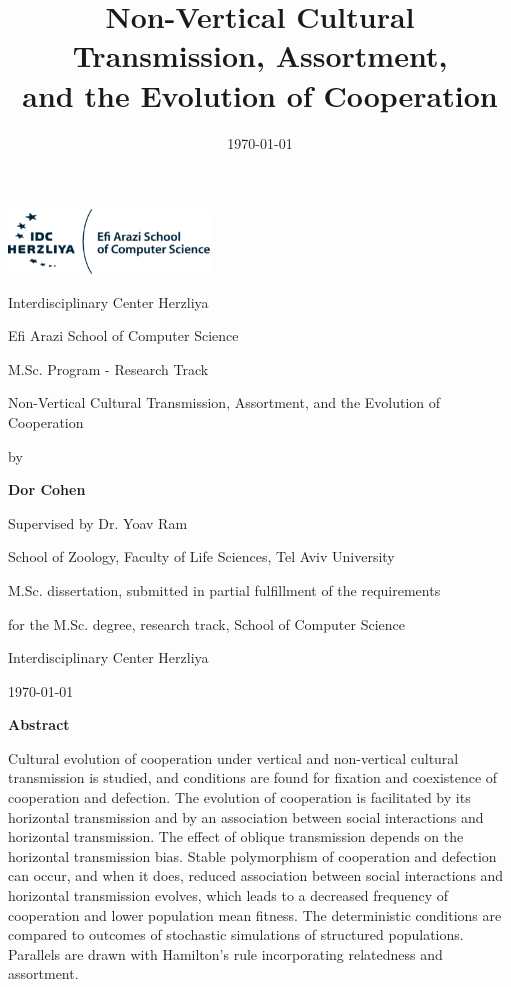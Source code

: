 \documentclass[12pt]{extarticle}
\title{Non-Vertical Cultural Transmission, Assortment, \\and the Evolution of Cooperation}
\date{\today}
\begin{document}
\begin{titlepage}
	\centering
	\includegraphics[width=0.4\textwidth]{IDC_logo}\par\vspace{1cm}
	{\huge Interdisciplinary Center Herzliya \par}
	{\Large Efi Arazi School of Computer Science \par}
	{\Large M.Sc. Program - Research Track \par}

	\vspace{1.5cm}
	{\Huge Non-Vertical Cultural 
  Transmission, 
  Assortment, and the 
  Evolution of 
  Cooperation \par}
	\vspace{1.5cm}
	{\large by\par}
	{\Large\bfseries Dor Cohen\par}
	\vspace{1cm}
	{\large Supervised by Dr. Yoav Ram\par}
	{School of Zoology, Faculty of Life Sciences, Tel Aviv University\par}

	\vspace{1cm}
	{M.Sc. dissertation, submitted in partial fulfillment of the requirements\par}
	{for the M.Sc. degree, research track, School of Computer Science\par}
	{Interdisciplinary Center Herzliya}

	\vspace{1cm}
	{\large \monthyeardate\today \par}

\end{titlepage}


{\huge \begin{center} \textbf{Abstract} \end{center}}

Cultural evolution of cooperation under vertical and non-vertical cultural transmission is studied, and conditions are found for fixation and coexistence of cooperation and defection. 
The evolution of cooperation is facilitated by its horizontal transmission and by an association between social interactions and horizontal transmission.
The effect of oblique transmission depends on the horizontal transmission bias.
Stable polymorphism of cooperation and defection can occur, and
when it does, reduced association between social interactions and horizontal transmission evolves, which leads to a decreased frequency of cooperation and lower population mean fitness.
The deterministic conditions are compared to outcomes of stochastic simulations of structured populations.
Parallels are drawn with Hamilton's rule incorporating relatedness and assortment.
\end{document}
